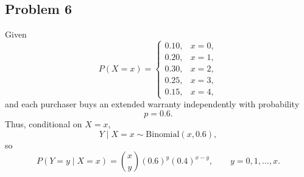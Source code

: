 \subsection*{Problem 6}

Given
\[
P(X=x)=
\begin{cases}
0.10, & x=0,\\
0.20, & x=1,\\
0.30, & x=2,\\
0.25, & x=3,\\
0.15, & x=4,
\end{cases}
\]
and each purchaser buys an extended warranty independently with probability
\[
p=0.6.
\]
Thus, conditional on $X=x$,
\[
Y \mid X=x \sim \text{Binomial}(x,0.6),
\]
so
\[
P(Y=y\mid X=x)=\binom{x}{y}(0.6)^y(0.4)^{x-y}, \qquad y=0,1,\dots,x.
\]

